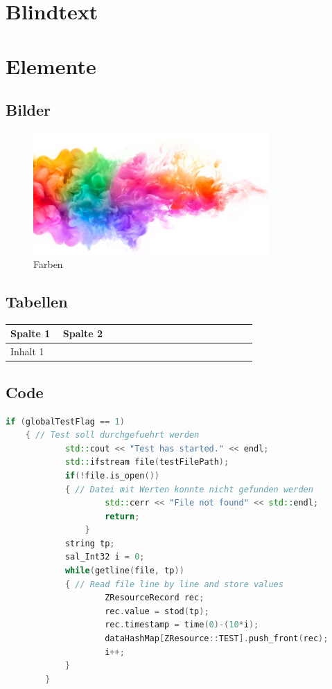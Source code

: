 \documentclass[german,a4paper,12pt]{article}
\begin{document}
\section{Blindtext}
\blindtext \par
\blindtext \par
\blindtext \cite{TANENBAUM2016}
\newpage
\section{Elemente}
\subsection{Bilder}
\vspace{10pt}
\begin{figure}[H]
    \centering
    \includegraphics[width=0.8\textwidth]{img/colors.png}
    \caption{Farben}
    \label{fig-adwareinstaller}
\end{figure}
\vspace{10pt}
\subsection{Tabellen}
\begin{table}[H]\begin{tabular}{@{}|p{0.2\linewidth}|p{0.745\linewidth}|@{}}\hline
	\textbf{Spalte 1} & \textbf{Spalte 2} \\\hline
	Inhalt 1 & \blindtext \\\hline
\end{tabular}\end{table}\vspace{10pt}
\subsection{Code}
\vspace{10pt}\begin{lstlisting}[language={C++}, caption={Test mit simulierten Werten (C\raisebox{0.25ex}{++})}, label={source-statistic}]
	if (globalTestFlag == 1)
	{ // Test soll durchgefuehrt werden
			std::cout << "Test has started." << endl;
			std::ifstream file(testFilePath);
			if(!file.is_open())
			{ // Datei mit Werten konnte nicht gefunden werden
					std::cerr << "File not found" << std::endl;
					return;
				}
			string tp;
			sal_Int32 i = 0;
			while(getline(file, tp))
			{ // Read file line by line and store values
					ZResourceRecord rec;
					rec.value = stod(tp);
					rec.timestamp = time(0)-(10*i);
					dataHashMap[ZResource::TEST].push_front(rec);
					i++;
			}			
		}
\end{lstlisting}\vspace{10pt}
\newpage
\printbibliography[title={Literatur}]
\end{document}
